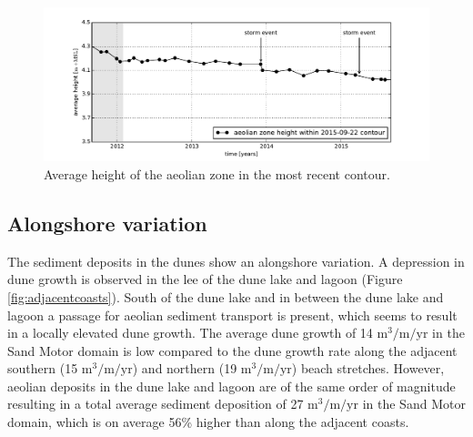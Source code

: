 
\begin{figure}
  \centering
  \includegraphics[width=\columnwidth]{../Figures/heights}
  \caption{Average height of the aeolian zone in the most recent
    contour.}
  \label{fig:heights}
\end{figure}



\subsection{Alongshore variation}

The sediment deposits in the dunes show an alongshore variation. A
depression in dune growth is observed in the lee of the dune lake and
lagoon (Figure \ref{fig:adjacentcoasts}). South of the dune lake and
in between the dune lake and lagoon a passage for aeolian sediment
transport is present, which seems to result in a locally elevated dune
growth. The average dune growth of 14 $\mathrm{m^3/m/yr}$ in the Sand
Motor domain is low compared to the dune growth rate along the
adjacent southern (15 $\mathrm{m^3/m/yr}$) and northern (19
$\mathrm{m^3/m/yr}$) beach stretches.  However, aeolian deposits in
the dune lake and lagoon are of the same order of magnitude resulting
in a total average sediment deposition of 27 $\mathrm{m^3/m/yr}$ in
the Sand Motor domain, which is on average 56\% higher than along the
adjacent coasts.

